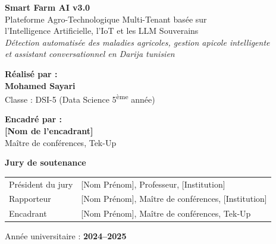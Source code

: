\begin{titlepage}
\begin{center}
\vspace{0.8cm}

\begin{tcolorbox}[
  enhanced, colback=farmblue!8, colframe=farmblue,
  arc=8pt, boxrule=1.5pt,
  width=\textwidth
]
\centering
{\LARGE\bfseries\color{farmblue} Smart Farm AI v3.0}\\[6pt]
{\large\color{farmgreen}
  Plateforme Agro-Technologique Multi-Tenant basée sur\\
  l'Intelligence Artificielle, l'IoT et les LLM Souverains}\\[4pt]
{\normalsize\color{farmgray}\textit{Détection automatisée des maladies agricoles, gestion apicole intelligente\\
et assistant conversationnel en Darija tunisien}}
\end{tcolorbox}

\vspace{0.8cm}

\begin{minipage}{0.5\textwidth}
  \raggedright
  {\normalsize\textbf{Réalisé par :}}\\[3pt]
  {\large\color{farmblue}\textbf{Mohamed Sayari}}\\
  {\small Classe : DSI-5 (Data Science 5\textsuperscript{ème} année)}
\end{minipage}%
\begin{minipage}{0.5\textwidth}
  \raggedleft
  {\normalsize\textbf{Encadré par :}}\\[3pt]
  {\large\textbf{[Nom de l'encadrant]}}\\
  {\small Maître de conférences, Tek-Up}
\end{minipage}

\vspace{0.6cm}

\begin{tcolorbox}[
  enhanced, colback=gray!5, colframe=farmgray,
  arc=4pt, boxrule=0.8pt, width=0.88\textwidth
]
\centering
\textbf{Jury de soutenance}\\[4pt]
\begin{tabular}{ll}
Président du jury  & [Nom Prénom], Professeur, [Institution]\\
Rapporteur         & [Nom Prénom], Maître de conférences, [Institution]\\
Encadrant          & [Nom Prénom], Maître de conférences, Tek-Up\\
\end{tabular}
\end{tcolorbox}

\vfill
{\normalsize Année universitaire : \textbf{2024--2025}}

\end{center}
\end{titlepage}

